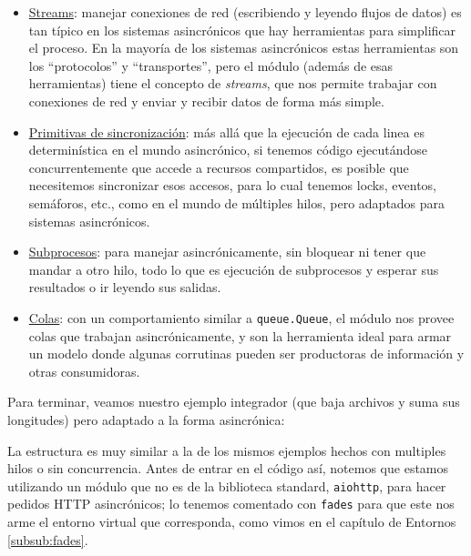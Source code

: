 \begin{itemize}
    \item \href{https://docs.python.org/es/dev/library/asyncio-stream.html}{Streams}: manejar conexiones de red (escribiendo y leyendo flujos de datos) es tan típico en los sistemas asincrónicos que hay herramientas para simplificar el proceso. En la mayoría de los sistemas asincrónicos estas herramientas son los ``protocolos'' y ``transportes'', pero el módulo  (además de esas herramientas) tiene el concepto de \textit{streams}, que nos permite trabajar con conexiones de red y enviar y recibir datos de forma más simple.
    \item \href{https://docs.python.org/es/dev/library/asyncio-sync.html}{Primitivas de sincronización}: más allá que la ejecución de cada linea es determinística en el mundo asincrónico, si tenemos código ejecutándose concurrentemente que accede a recursos compartidos, es posible que necesitemos sincronizar esos accesos, para lo cual tenemos locks, eventos, semáforos, etc., como en el mundo de múltiples hilos, pero adaptados para sistemas asincrónicos.
    \item \href{https://docs.python.org/es/dev/library/asyncio-subprocess.html}{Subprocesos}: para manejar asincrónicamente, sin bloquear ni tener que mandar a otro hilo, todo lo que es ejecución de subprocesos y esperar sus resultados o ir leyendo sus salidas.
    \item \href{https://docs.python.org/es/dev/library/asyncio-queue.html}{Colas}: con un comportamiento similar a \texttt{queue.Queue}, el módulo  nos provee colas que trabajan asincrónicamente, y son la herramienta ideal para armar un modelo donde algunas corrutinas pueden ser productoras de información y otras consumidoras.
\end{itemize}


Para terminar, veamos nuestro ejemplo integrador (que baja archivos y suma sus longitudes) pero adaptado a la forma asincrónica:


La estructura es muy similar a la de los mismos ejemplos hechos con multiples hilos o sin concurrencia. Antes de entrar en el código así, notemos que estamos utilizando un módulo que no es de la biblioteca standard, \texttt{aiohttp}, para hacer pedidos HTTP asincrónicos; lo tenemos comentado con \texttt{fades} para que este nos arme el entorno virtual que corresponda, como vimos en el capítulo de Entornos \ref{subsub:fades}.

